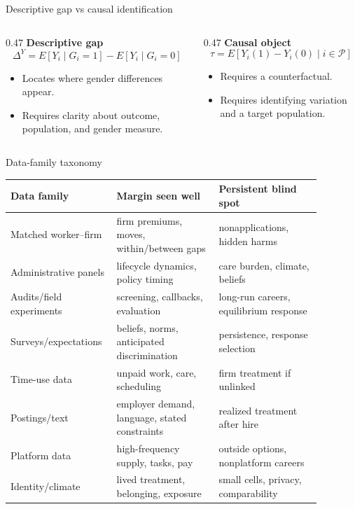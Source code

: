 \documentclass[aspectratio=169,11pt]{beamer}
\begin{document}
\begin{frame}{Descriptive gap vs causal identification}
\begin{columns}[T,onlytextwidth]
\begin{column}{0.47\linewidth}
\textbf{Descriptive gap}
\[
\Delta^Y = E[Y_i\mid G_i=1] - E[Y_i\mid G_i=0]
\]
\begin{itemize}
    \item Locates where gender differences appear.
    \item Requires clarity about outcome, population, and gender measure.
\end{itemize}
\end{column}
\begin{column}{0.47\linewidth}
\textbf{Causal object}
\[
\tau = E[Y_i(1)-Y_i(0)\mid i\in \mathcal{P}]
\]
\begin{itemize}
    \item Requires a counterfactual.
    \item Requires identifying variation and a target population.
\end{itemize}
\end{column}
\end{columns}
\end{frame}

\begin{frame}{Data-family taxonomy}
\scriptsize
\begin{tabular}{p{0.26\linewidth} p{0.31\linewidth} p{0.31\linewidth}}
\toprule
Data family & Margin seen well & Persistent blind spot \\
\midrule
Matched worker--firm & firm premiums, moves, within/between gaps & nonapplications, hidden harms \\
Administrative panels & lifecycle dynamics, policy timing & care burden, climate, beliefs \\
Audits/field experiments & screening, callbacks, evaluation & long-run careers, equilibrium response \\
Surveys/expectations & beliefs, norms, anticipated discrimination & persistence, response selection \\
Time-use data & unpaid work, care, scheduling & firm treatment if unlinked \\
Postings/text & employer demand, language, stated constraints & realized treatment after hire \\
Platform data & high-frequency supply, tasks, pay & outside options, nonplatform careers \\
Identity/climate & lived treatment, belonging, exposure & small cells, privacy, comparability \\
\bottomrule
\end{tabular}
\end{frame}
\end{document}
